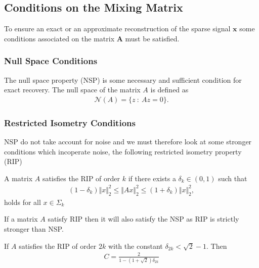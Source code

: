 \subsection{Conditions on the Mixing Matrix}
To ensure an exact or an approximate reconstruction of the sparse signal $\mathbf{x}$ some conditions associated on the matrix $\mathbf{A}$ must be satisfied.

\subsubsection{Null Space Conditions}
The null space property (NSP) is some necessary and sufficient condition for exact recovery.
The null space of the matrix $A$ is defined as
\begin{align*}
\mathcal{N}(A) = \{ z \ : \ Az = 0 \}.
\end{align*} 





\subsubsection{Restricted Isometry Conditions}
NSP do not take account for noise and we must therefore look at some stronger conditions which incoperate noise, the following restricted isometry property (RIP) %

\begin{definition}
A matrix $A$ satisfies the RIP of order $k$ if there exists a $\delta_k \in (0,1)$ such that
\begin{align*}
(1 - \delta_k) \Vert x \Vert_2^2 \leq \Vert Ax \Vert_2^2 \leq (1 + \delta_k) \Vert x \Vert_2^2,
\end{align*}
holds for all $x \in \Sigma_k$
\end{definition}


If a matrix $A$ satisfy RIP then it will also satisfy the NSP as RIP is strictly stronger than NSP.
\begin{theorem}
If $A$ satisfies the RIP of order $2k$ with the constant $\delta_{2k} < \sqrt{2} -1$. Then
\begin{align*}
C = \frac{2}{1 - (1 + \sqrt{2}) \delta_{2k}}
\end{align*}
\end{theorem} 

